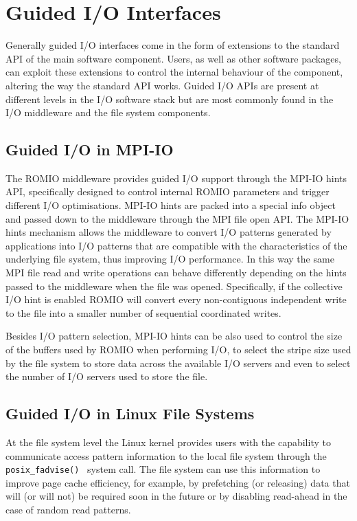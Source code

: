 \section{Guided I/O Interfaces} \label{sec: guided-io}
Generally guided I/O interfaces come in the form of extensions to the standard API of the main software component. Users, as well as other software packages, can exploit these extensions to control the internal behaviour of the component, altering the way the standard API works. Guided I/O APIs are present at different levels in the I/O software stack but are most commonly found in the I/O middleware and the file system components.

\subsection{Guided I/O in MPI-IO} \label{subsec: mpi-io-hints}
The ROMIO middleware provides guided I/O support through the MPI-IO hints API, specifically designed to control internal ROMIO parameters and trigger different I/O optimisations. MPI-IO hints are packed into a special info object and passed down to the middleware through the MPI file open API. The MPI-IO hints mechanism allows the middleware to convert I/O patterns generated by applications into I/O patterns that are compatible with the characteristics of the underlying file system, thus improving I/O performance. In this way the same MPI file read and write operations can behave differently depending on the hints passed to the middleware when the file was opened. Specifically, if the collective I/O hint is enabled ROMIO will convert every non-contiguous independent write to the file into a smaller number of sequential coordinated writes.

Besides I/O pattern selection, MPI-IO hints can be also used to control the size of the buffers used by ROMIO when performing I/O, to select the stripe size used by the file system to store data across the available I/O servers and even to select the number of I/O servers used to store the file.

\subsection{Guided I/O in Linux File Systems} \label{subsec: posix-advice}
At the file system level the Linux kernel provides users with the capability to communicate access pattern information to the local file system through the \texttt{posix\_fadvise()}~\cite{AdviseAPI} system call. The file system can use this information to improve page cache efficiency, for example, by prefetching (or releasing) data that will (or will not) be required soon in the future or by disabling read-ahead in the case of random read patterns. %

